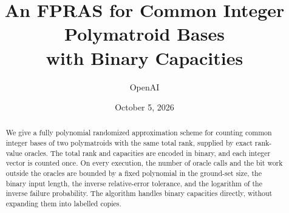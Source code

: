 \documentclass[11pt]{article}
\title{An FPRAS for Common Integer Polymatroid Bases\\with Binary Capacities}
\author{OpenAI}
\date{October 5, 2026}
\theoremstyle{definition}
\theoremstyle{remark}
\numberwithin{equation}{section}
\begin{document}
\maketitle
\begin{abstract}
We give a fully polynomial randomized approximation scheme for counting
common integer bases of two polymatroids with the same total rank, supplied
by exact rank-value oracles. The total rank and capacities are encoded in
binary, and each integer vector is counted once. On every execution, the
number of oracle calls and the bit work outside the oracles are bounded
by a fixed polynomial in the ground-set size, the binary input length,
the inverse relative-error tolerance, and the logarithm of the inverse
failure probability. The algorithm handles binary capacities directly,
without expanding them into labelled copies.
\end{abstract}










\begingroup
\small
\raggedright

\endgroup
\end{document}
